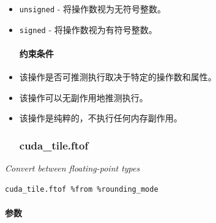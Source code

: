 \documentclass{article}
\begin{document}
\begin{itemize}
\item \texttt{unsigned} - 将操作数视为无符号整数。
\item \texttt{signed} - 将操作数视为有符号整数。


\paragraph{约束条件}

\item 该操作是否可推测执行取决于特定的操作数和属性。
\item 该操作可以无副作用地推测执行。
\item 该操作是纯粹的，不执行任何内存副作用。


\subsubsection{cuda\_tile.ftof}

\end{itemize}
\textit{Convert between floating-point types}


\begin{lstlisting}
cuda_tile.ftof %from %rounding_mode
\end{lstlisting}

\paragraph{参数}
\end{document}
